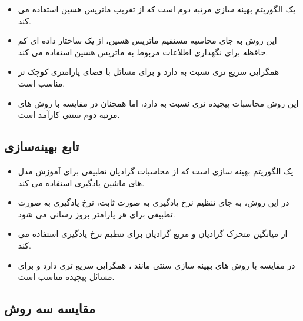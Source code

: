\documentclass[12pt, dvipsnames, svgnames, x11names,]{article}
\begin{document}
			\begin{itemize}
				
				\item {} یک الگوریتم بهینه سازی مرتبه دوم است که از تقریب ماتریس هسین استفاده می کند.
				
				\item این روش به جای محاسبه مستقیم ماتریس هسین، از یک ساختار داده ای کم حافظه برای نگهداری اطلاعات مربوط به ماتریس هسین استفاده می کند.
				
				\item {} همگرایی سریع تری نسبت به  دارد و برای مسائل با فضای پارامتری کوچک تر مناسب است.
				
				\item این روش محاسبات پیچیده تری نسبت به  دارد، اما همچنان در مقایسه با روش های مرتبه دوم سنتی کارآمد است.
				
			\end{itemize}
		
		
		\subsection{تابع بهینه‌سازی }
			
			\begin{itemize}
				
				\item {} یک الگوریتم بهینه سازی است که از محاسبات گرادیان تطبیقی برای آموزش مدل های ماشین یادگیری استفاده می کند.
				
				\item در این روش، به جای تنظیم نرخ یادگیری به صورت ثابت، نرخ یادگیری به صورت تطبیقی برای هر پارامتر بروز رسانی می شود.
				
				\item {} از میانگین متحرک گرادیان و مربع گرادیان برای تنظیم نرخ یادگیری استفاده می کند.
				
				\item {} در مقایسه با روش های بهینه سازی سنتی مانند ، همگرایی سریع تری دارد و برای مسائل پیچیده مناسب است.
				
			\end{itemize}
		
		\subsection{مقایسه سه روش}
			
\end{document}
